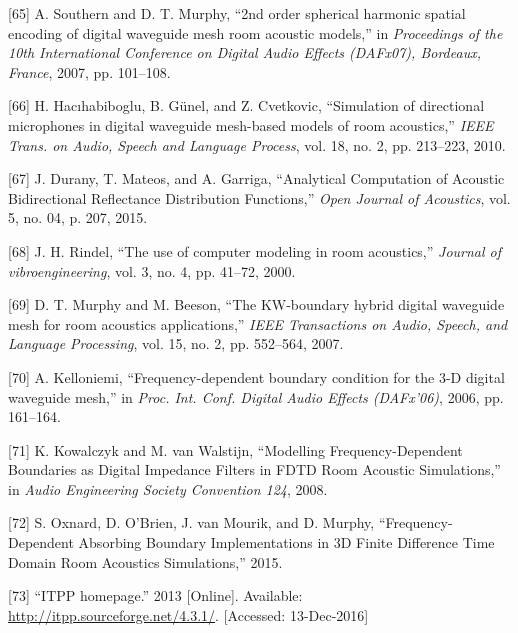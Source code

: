 \documentclass[]{scrreprt}
\begin{document}
\hypertarget{ref-southernux5f2ndux5f2007}{}
{[}65{]} A. Southern and D. T. Murphy, ``2nd order spherical harmonic
spatial encoding of digital waveguide mesh room acoustic models,'' in
\emph{Proceedings of the 10th International Conference on Digital Audio
Effects (DAFx07), Bordeaux, France}, 2007, pp. 101--108.

\hypertarget{ref-hacihabibogluux5fsimulationux5f2010}{}
{[}66{]} H. Hacıhabiboglu, B. Günel, and Z. Cvetkovic, ``Simulation of
directional microphones in digital waveguide mesh-based models of room
acoustics,'' \emph{IEEE Trans. on Audio, Speech and Language Process},
vol. 18, no. 2, pp. 213--223, 2010.

\hypertarget{ref-duranyux5fanalyticalux5f2015}{}
{[}67{]} J. Durany, T. Mateos, and A. Garriga, ``Analytical Computation
of Acoustic Bidirectional Reflectance Distribution Functions,''
\emph{Open Journal of Acoustics}, vol. 5, no. 04, p. 207, 2015.

\hypertarget{ref-rindelux5fuseux5f2000}{}
{[}68{]} J. H. Rindel, ``The use of computer modeling in room
acoustics,'' \emph{Journal of vibroengineering}, vol. 3, no. 4, pp.
41--72, 2000.

\hypertarget{ref-murphyux5fkw-boundaryux5f2007}{}
{[}69{]} D. T. Murphy and M. Beeson, ``The KW-boundary hybrid digital
waveguide mesh for room acoustics applications,'' \emph{IEEE
Transactions on Audio, Speech, and Language Processing}, vol. 15, no. 2,
pp. 552--564, 2007.

\hypertarget{ref-kelloniemiux5ffrequency-dependentux5f2006}{}
{[}70{]} A. Kelloniemi, ``Frequency-dependent boundary condition for the
3-D digital waveguide mesh,'' in \emph{Proc. Int. Conf. Digital Audio
Effects (DAFx'06)}, 2006, pp. 161--164.

\hypertarget{ref-kowalczykux5fmodellingux5f2008}{}
{[}71{]} K. Kowalczyk and M. van Walstijn, ``Modelling
Frequency-Dependent Boundaries as Digital Impedance Filters in FDTD Room
Acoustic Simulations,'' in \emph{Audio Engineering Society Convention
124}, 2008.

\hypertarget{ref-oxnardux5ffrequency-dependentux5f2015}{}
{[}72{]} S. Oxnard, D. O'Brien, J. van Mourik, and D. Murphy,
``Frequency-Dependent Absorbing Boundary Implementations in 3D Finite
Difference Time Domain Room Acoustics Simulations,'' 2015.

\hypertarget{ref-ux5fitppux5f2013}{}
{[}73{]} ``ITPP homepage.'' 2013 {[}Online{]}. Available:
\url{http://itpp.sourceforge.net/4.3.1/}. {[}Accessed: 13-Dec-2016{]}
\end{document}

